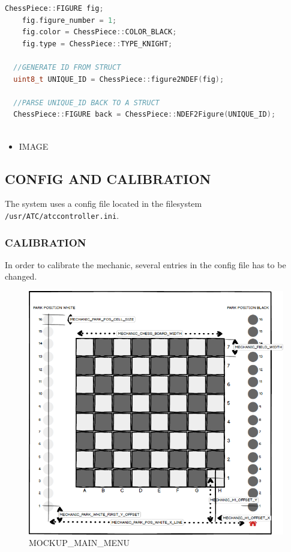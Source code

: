 \begin{lstlisting}[language={C++}]
  ChessPiece::FIGURE fig;
    fig.figure_number = 1;
    fig.color = ChessPiece::COLOR_BLACK;
    fig.type = ChessPiece::TYPE_KNIGHT;
  
  //GENERATE ID FROM STRUCT
  uint8_t UNIQUE_ID = ChessPiece::figure2NDEF(fig);
  
  //PARSE UNIQUE_ID BACK TO A STRUCT
  ChessPiece::FIGURE back = ChessPiece::NDEF2Figure(UNIQUE_ID);
  
\end{lstlisting}

\begin{itemize}
\tightlist
\item
  IMAGE
\end{itemize}

\hypertarget{config-and-calibration}{%
\subsection{CONFIG AND CALIBRATION}\label{config-and-calibration}}

The system uses a config file located in the filesystem
\passthrough{\lstinline!/usr/ATC/atccontroller.ini!}.

\hypertarget{calibration}{%
\subsubsection{CALIBRATION}\label{calibration}}

In order to calibrate the mechanic, several entries in the config file
has to be changed.

\begin{figure}
\centering
\includegraphics{./images/ATC_Calibration_Guide.png}
\caption{MOCKUP\_MAIN\_MENU}
\end{figure}

